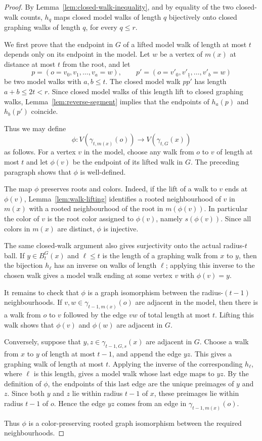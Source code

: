 \documentclass[11pt]{amsart}
\theoremstyle{remark}
\begin{document}
\begin{proof}
By Lemma~\ref{lem:closed-walk-inequality}, and by equality of the two closed-walk counts, $h_q$ maps closed model walks of length $q$ bijectively onto closed graphing walks of length $q$, for every $q\leq r$.

We first prove that the endpoint in $G$ of a lifted model walk of length at most $t$ depends only on its endpoint in the model.  Let $w$ be a vertex of $m(x)$ at distance at most $t$ from the root, and let
\[
 p=(o=v_0,v_1,\ldots,v_a=w),\qquad
 p'=(o=v'_0,v'_1,\ldots,v'_b=w)
\]
be two model walks with $a,b\leq t$.  The closed model walk $p\overline{p'}$ has length $a+b\leq 2t<r$.  Since closed model walks of this length lift to closed graphing walks, Lemma~\ref{lem:reverse-segment} implies that the endpoints of $h_a(p)$ and $h_b(p')$ coincide.

Thus we may define
\[
 \phi\colon V(\gamma_{t,m(x)}(o))\to V(\gamma_{t,G}(x))
\]
as follows.  For a vertex $v$ in the model, choose any walk from $o$ to $v$ of length at most $t$ and let $\phi(v)$ be the endpoint of its lifted walk in $G$.  The preceding paragraph shows that $\phi$ is well-defined.

The map $\phi$ preserves roots and colors.  Indeed, if the lift of a walk to $v$ ends at $\phi(v)$, Lemma~\ref{lem:walk-lifting} identifies a rooted neighbourhood of $v$ in $m(x)$ with a rooted neighbourhood of the root in $m(\phi(v))$.  In particular the color of $v$ is the root color assigned to $\phi(v)$, namely $s(\phi(v))$.  Since all colors in $m(x)$ are distinct, $\phi$ is injective.

The same closed-walk argument also gives surjectivity onto the actual radius-$t$ ball.  If $y\in B_t^G(x)$ and $\ell\leq t$ is the length of a graphing walk from $x$ to $y$, then the bijection $h_\ell$ has an inverse on walks of length $\ell$; applying this inverse to the chosen walk gives a model walk ending at some vertex $v$ with $\phi(v)=y$.

It remains to check that $\phi$ is a graph isomorphism between the radius-$(t-1)$ neighbourhoods.  If $v,w\in\gamma_{t-1,m(x)}(o)$ are adjacent in the model, then there is a walk from $o$ to $v$ followed by the edge $vw$ of total length at most $t$.  Lifting this walk shows that $\phi(v)$ and $\phi(w)$ are adjacent in $G$.

Conversely, suppose that $y,z\in\gamma_{t-1,G,s}(x)$ are adjacent in $G$.  Choose a walk from $x$ to $y$ of length at most $t-1$, and append the edge $yz$.  This gives a graphing walk of length at most $t$.  Applying the inverse of the corresponding $h_\ell$, where $\ell$ is this length, gives a model walk whose last edge maps to $yz$.  By the definition of $\phi$, the endpoints of this last edge are the unique preimages of $y$ and $z$.  Since both $y$ and $z$ lie within radius $t-1$ of $x$, these preimages lie within radius $t-1$ of $o$.  Hence the edge $yz$ comes from an edge in $\gamma_{t-1,m(x)}(o)$.

Thus $\phi$ is a color-preserving rooted graph isomorphism between the required neighbourhoods.
\end{proof}
\end{document}
